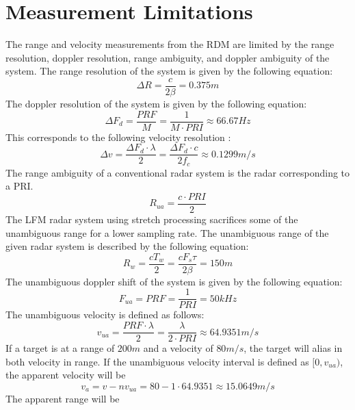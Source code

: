 \documentclass[conference]{IEEEtran}
\begin{document}
\section{Measurement Limitations}
The range and velocity measurements from the RDM are limited by the range resolution, doppler resolution, range ambiguity, and doppler ambiguity of the system. The range resolution of the system is given by the following equation:
\begin{equation}
\Delta R = \frac{c}{2\beta} = 0.375m
\end{equation}
The doppler resolution of the system is given by the following equation:
\begin{equation}
\Delta F_d = \frac{PRF}{M} = \frac{1}{M\cdot PRI} \approx 66.67Hz
\end{equation}
This corresponds to the following velocity resolution :
\begin{equation}
\Delta v = \frac{\Delta F_d \cdot \lambda}{2} = \frac{\Delta F_d \cdot c}{2f_c} \approx 0.1299 m/s
\end{equation}
The range ambiguity of a conventional radar system is the radar corresponding to a PRI. 
\begin{equation}
R_{ua} = \frac{c \cdot PRI}{2} 
\end{equation}
The LFM radar system using stretch processing sacrifices some of the unambiguous range for a lower sampling rate. The unambiguous range of the given radar system is described by the following equation:
\begin{equation}
\label{Rw CPI0}
R_w = \frac{c T_w}{2} = \frac{c F_s \tau}{2\beta} = 150m
\end{equation}
The unambiguous doppler shift of the system is given by the following equation:
\begin{equation}
F_{ua} = PRF = \frac{1}{PRI} = 50kHz
\end{equation}
The unambiguous velocity is defined as follows:
\begin{equation}
\label{vua CPI0}
v_{ua} = \frac{PRF\cdot\lambda}{2} = \frac{\lambda}{2\cdot PRI} \approx 64.9351m/s 
\end{equation}
If a target is at a range of $200m$ and a velocity of $80m/s$, the target will alias in both velocity in range. If the unambiguous velocity interval is defined as $[0, v_{ua})$, the apparent velocity will be
\begin{equation}
v_a = v - nv_{ua} = 80 - 1 \cdot 64.9351 \approx 15.0649m/s
\end{equation}
The apparent range will be
\end{document}
